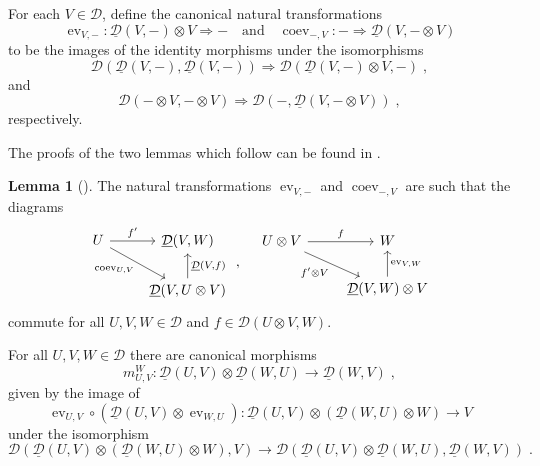 \documentclass[12pt,dvipsnames]{article}
\numberwithin{equation}{section}
\theoremstyle{definition}
\newtheorem{lemma}[definition]{Lemma}
\newcommand{\cat}[1]{\mathcal{#1}}
\newcommand{\1}{\ensuremath{\mathbbm{1}}}
\DeclareMathOperator{\ev}{ev}
\DeclareMathOperator{\coev}{coev}
\newcommand{\blank}{{-}}
\begin{document}
For each $V\in\cat{D}$, define the canonical natural transformations
\begin{equation}\label{eq:eviso}
    \ev_{V,\blank}:\underline{\cat{D}}(V,\blank)\otimes V \Rightarrow \blank \quad\text{and}\quad \coev_{\blank,V}:\blank\Rightarrow \underline{\cat{D}}(V,\blank\otimes V)
\end{equation}
to be the images of the identity morphisms under the isomorphisms 
\begin{equation}\label{eq:coeviso}
    \cat{D}(\underline{\cat{D}}(V,\blank),\underline{\cat{D}}(V,\blank))\Rightarrow\cat{D}(\underline{\cat{D}}(V,\blank)\otimes V,\blank) \;,
\end{equation}
and
\begin{equation}
    \cat{D}(\blank\otimes V,\blank\otimes V) \Rightarrow \cat{D}(\blank,\underline{\cat{D}}(V,\blank\otimes V)) \;,
\end{equation}
respectively.

The proofs of the two lemmas which follow can be found in \cite[Ch.\,II]{EK66}.
\begin{lemma}[{\cite[Eqs.\,(II.3.4) \& (II.3.5)]{EK66}}] \label{lemma:ClosedStructureA}
    The natural transformations $\ev_{V,\blank}$ and $\coev_{\blank,V}$ are such that the diagrams
    \begin{equation}
        \begin{tikzcd}
            U & \underline{\cat{D}}(V,W) \\
             & \underline{\cat{D}}(V,U\otimes V)
            \arrow["{f^\prime}", from=1-1, to=1-2]
            \arrow["{\coev_{U,V}}"', from=1-1, to=2-2]\arrow["{\underline{\cat{D}}(V,f)}"', from=2-2, to=1-2]
        \end{tikzcd} \;,\quad \begin{tikzcd}
            U\otimes V & W \\
             & \underline{\cat{D}}(V,W)\otimes V
            \arrow["{f}", from=1-1, to=1-2]
            \arrow["{f^\prime\otimes V}"', from=1-1, to=2-2]\arrow["{\ev_{V,W}}"', from=2-2, to=1-2]
        \end{tikzcd}
    \end{equation}
    commute for all $U,V,W\in\cat{D}$ and $f\in\cat{D}(U\otimes V,W)$.
\end{lemma}
For all $U,V,W\in\cat{D}$ there are canonical morphisms
\begin{equation}
    m_{U,V}^W:\underline{\cat{D}}(U,V)\otimes\underline{\cat{D}}(W,U) \to \underline{\cat{D}}(W,V) \;,
\end{equation}
given by the image of 
\begin{equation}
    \ev_{U,V}\circ(\underline{\cat{D}}(U,V)\otimes\ev_{W,U}): \underline{\cat{D}}(U,V)\otimes(\underline{\cat{D}}(W,U)\otimes W) \to V
\end{equation}
under the isomorphism
\begin{equation}
    \cat{D}(\underline{\cat{D}}(U,V)\otimes(\underline{\cat{D}}(W,U)\otimes W), V) \to \cat{D}(\underline{\cat{D}}(U,V)\otimes\underline{\cat{D}}(W,U), \underline{\cat{D}}(W,V)) \;.
\end{equation}
\end{document}
